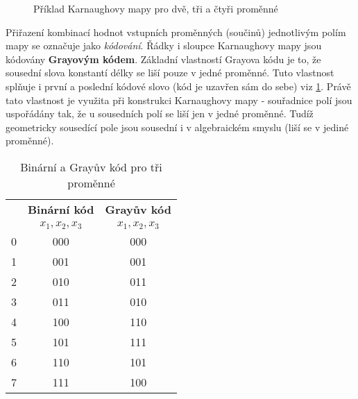 {      \begin{figure}[hb!]
          \centering
        \caption{Příklad Karnaughovy mapy pro dvě, tři a čtyři proměnné}\label{CES:karnaugh_234}
      \end{figure}     
      
      Přiřazení kombinací hodnot vstupních proměnných (součinů) jednotlivým polím mapy se označuje 
      jako \emph{kódování}. Řádky i sloupce Karnaughovy mapy jsou kódovány \textbf{Grayovým kódem}. 
      Základní vlastností Grayova kódu je to, že sousední slova konstantí délky se liší pouze v 
      jedné proměnné. Tuto vlastnost splňuje i první a poslední kódové slovo (kód je uzavřen sám
      do sebe) viz \ref{CES:BCD_Gray_c}. Právě tato vlastnost je využita při konstrukci Karnaughovy 
      mapy - souřadnice polí jsou uspořádány tak, že u sousedních polí se liší jen v jedné 
      proměnné. Tudíž geometricky sousedící pole jsou sousední i v algebraickém smyslu (liší se v 
      jediné proměnné).  
      
     \begin{table}[ht!] 
       \centering 
       \begin{tabular}{|c|c|c|}
         \hline
         \rowcolor{CornflowerBlue}{\textbf{Číslo}}  & \textbf{Binární kód} & \textbf{Grayův kód} \\
         \rowcolor{CornflowerBlue}{ }               &     {$x_1,x_2,x_3$}  & {$x_1,x_2,x_3$}     \\
          \hline\hline  
             \cellcolor[gray]{0.9}0                 & 000                  & 000               \\
          \hline       
             \cellcolor[gray]{0.9}1                 & 001                  & 001               \\
          \hline  
             \cellcolor[gray]{0.9}2                 & 010                  & 011               \\
          \hline  
             \cellcolor[gray]{0.9}3                 & 011                  & 010               \\
          \hline  
             \cellcolor[gray]{0.9}4                 & 100                  & 110               \\
          \hline         
             \cellcolor[gray]{0.9}5                 & 101                  & 111               \\
          \hline  
             \cellcolor[gray]{0.9}6                 & 110                  & 101               \\
          \hline  
             \cellcolor[gray]{0.9}7                 & 111                  & 100               \\
          \hline
       \end{tabular}
       \caption{Binární a Grayův kód pro tři proměnné}
       \label{CES:BCD_Gray_c}    
     \end{table}       
      
}
